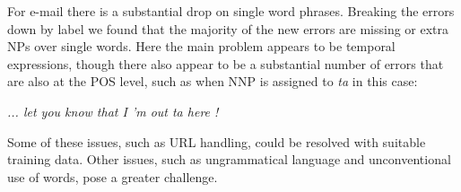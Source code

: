 \begin{landscape}

\end{landscape}

For e-mail there is a substantial drop on single word phrases.  Breaking the
errors down by label we found that the majority of the new errors are missing
or extra NPs over single words.  Here the main problem appears to be temporal
expressions, though there also appear to be a substantial number of errors that
are also at the POS level, such as when NNP is assigned to \emph{ta} in this
case:

\vspace{3mm}
\emph{... let you know that I 'm out ta here !}
\vspace{3mm}

Some of these issues, such as URL handling, could be resolved with suitable
training data.  Other issues, such as ungrammatical language and
unconventional use of words, pose a greater challenge.

